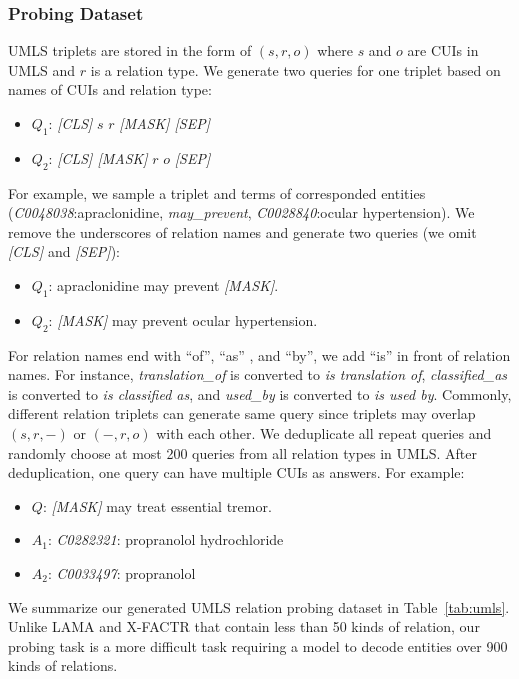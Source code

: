 \documentclass[11pt]{article}
\begin{document}
\subsubsection{Probing Dataset}
UMLS triplets are stored in the form of $(s,r,o)$ where $s$ and $o$ are CUIs in UMLS and $r$ is a relation type.
We generate two queries for one triplet based on names of CUIs and relation type:
\begin{itemize}
    \item $Q_1$: \textit{[CLS]} $s$ $r$ \textit{[MASK] [SEP]}
    \item $Q_2$: \textit{[CLS] [MASK]} $r$ $o$ \textit{[SEP]}
\end{itemize}
For example, we sample a triplet and terms of corresponded entities (\textit{C0048038}:apraclonidine, \textit{may\_prevent}, \textit{C0028840}:ocular hypertension).
We remove the underscores of relation names and generate two queries (we omit \textit{[CLS]} and \textit{[SEP]}):
\begin{itemize}
    \item $Q_1$: apraclonidine may prevent \textit{[MASK]}.
    \item $Q_2$: \textit{[MASK]} may prevent ocular hypertension.
\end{itemize}
For relation names end with ``of'', ``as'' , and ``by'', we add ``is'' in front of relation names.
For instance, \textit{translation\_of} is converted to \textit{is translation of}, \textit{classified\_as} is converted to \textit{is classified as}, and \textit{used\_by} is converted to \textit{is used by}.
Commonly, different relation triplets can generate same query since triplets may overlap $(s,r,-)$ or $(-,r,o)$ with each other.
We deduplicate all repeat queries and randomly choose at most 200 queries from all relation types in UMLS.
After deduplication, one query can have multiple CUIs as answers.
For example:
\begin{itemize}
    \item $Q$: \textit{[MASK]} may treat essential tremor.
    \item $A_1$: \textit{C0282321}: propranolol hydrochloride
    \item $A_2$: \textit{C0033497}: propranolol
\end{itemize}
We summarize our generated UMLS relation probing dataset in Table~\ref{tab:umls}.
Unlike LAMA \cite{petroni-etal-2019-language} and X-FACTR \cite{jiang-etal-2020-x} that contain less than 50 kinds of relation, our probing task is a more difficult task requiring a model to decode entities over 900 kinds of relations.
\end{document}
